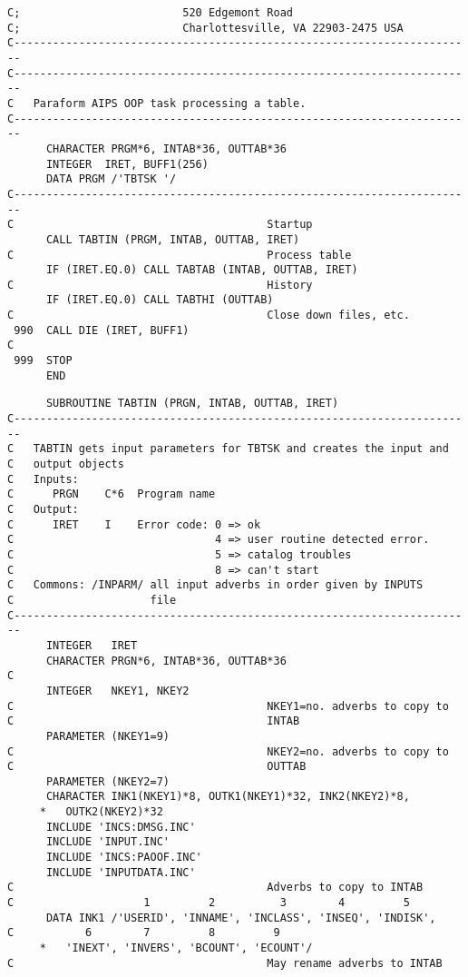{\begin{verbatim}
C;                         520 Edgemont Road
C;                         Charlottesville, VA 22903-2475 USA
C-----------------------------------------------------------------------
C-----------------------------------------------------------------------
C   Paraform AIPS OOP task processing a table.
C-----------------------------------------------------------------------
      CHARACTER PRGM*6, INTAB*36, OUTTAB*36
      INTEGER  IRET, BUFF1(256)
      DATA PRGM /'TBTSK '/
C-----------------------------------------------------------------------
C                                       Startup
      CALL TABTIN (PRGM, INTAB, OUTTAB, IRET)
C                                       Process table
      IF (IRET.EQ.0) CALL TABTAB (INTAB, OUTTAB, IRET)
C                                       History
      IF (IRET.EQ.0) CALL TABTHI (OUTTAB)
C                                       Close down files, etc.
 990  CALL DIE (IRET, BUFF1)
C
 999  STOP
      END
\end{verbatim}
\begin{verbatim}
      SUBROUTINE TABTIN (PRGN, INTAB, OUTTAB, IRET)
C-----------------------------------------------------------------------
C   TABTIN gets input parameters for TBTSK and creates the input and
C   output objects
C   Inputs:
C      PRGN    C*6  Program name
C   Output:
C      IRET    I    Error code: 0 => ok
C                               4 => user routine detected error.
C                               5 => catalog troubles
C                               8 => can't start
C   Commons: /INPARM/ all input adverbs in order given by INPUTS
C                     file
C-----------------------------------------------------------------------
      INTEGER   IRET
      CHARACTER PRGN*6, INTAB*36, OUTTAB*36
C
      INTEGER   NKEY1, NKEY2
C                                       NKEY1=no. adverbs to copy to
C                                       INTAB
      PARAMETER (NKEY1=9)
C                                       NKEY2=no. adverbs to copy to
C                                       OUTTAB
      PARAMETER (NKEY2=7)
      CHARACTER INK1(NKEY1)*8, OUTK1(NKEY1)*32, INK2(NKEY2)*8,
     *   OUTK2(NKEY2)*32
      INCLUDE 'INCS:DMSG.INC'
      INCLUDE 'INPUT.INC'
      INCLUDE 'INCS:PAOOF.INC'
      INCLUDE 'INPUTDATA.INC'
C                                       Adverbs to copy to INTAB
C                    1         2          3        4         5
      DATA INK1 /'USERID', 'INNAME', 'INCLASS', 'INSEQ', 'INDISK',
C           6        7         8         9
     *   'INEXT', 'INVERS', 'BCOUNT', 'ECOUNT'/
C                                       May rename adverbs to INTAB

\end{verbatim}}
